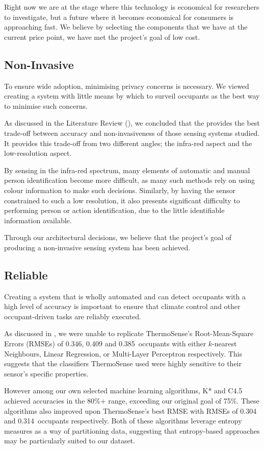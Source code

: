 \documentclass[../thesis/thesis.tex]{subfiles}
\begin{document}
Right now we are at the stage where this technology is economical for researchers to investigate, but a future where it becomes economical for consumers is approaching fast. We believe by selecting the components that we have at the current price point, we have met the project's goal of low cost.

\subsection{Non-Invasive}
To ensure wide adoption, minimising privacy concerns is necessary. We viewed creating a system with little means by which to  surveil occupants as the best way to minimise such concerns.

As discussed in the Literature Review (), we concluded that the \mlx provides the best trade-off between accuracy and non-invasiveness of those sensing systems studied. It provides this trade-off from two different angles; the infra-red aspect and the low-resolution aspect. 

By sensing in the infra-red spectrum, many elements of automatic and manual person identification become more difficult, as many such methods rely on using colour information to make such decisions. Similarly, by having the sensor constrained to such a low resolution, it also presents significant difficulty to performing person or action identification, due to the little identifiable information available.

Through our architectural decisions, we believe that the project's goal of producing a non-invasive sensing system has been achieved.

\subsection{Reliable}
Creating a system that is wholly automated and can detect occupants with a high level of accuracy is important to ensure that climate control and other occupant-driven tasks are reliably executed.

As discussed in , we were unable to replicate ThermoSense's Root-Mean-Square Errors (RMSEs) of 0.346, 0.409 and 0.385~occupants with either $k$-nearest Neighbours, Linear Regression, or Multi-Layer Perceptron respectively. This suggests that the classifiers ThermoSense used were highly sensitive to their sensor's specific properties.

However among our own selected machine learning algorithms, K* and C4.5 achieved accuracies in the 80\%+ range, exceeding our original goal of 75\%. These algorithms also improved upon ThermoSense's best RMSE with RMSEs of 0.304 and 0.314~occupants respectively. Both of these algorithms leverage entropy measures as a way of partitioning data, suggesting that entropy-based approaches may be particularly suited to our dataset.
\end{document}
